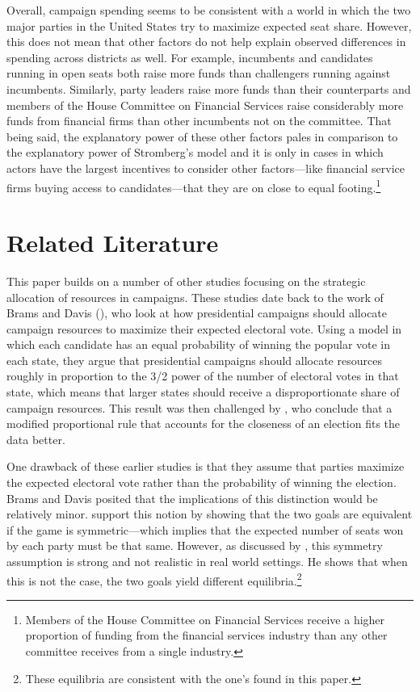 \documentclass[12pt,final,fleqn]{article}
\theoremstyle{plain}
\begin{document}
Overall, campaign spending seems to be consistent with a world in which the two major parties in the United States try to maximize expected seat share. However, this does not mean that other factors do not help explain observed differences in spending across districts as well. For example, incumbents and candidates running in open seats both raise more funds than challengers running against incumbents. Similarly, party leaders raise more funds than their counterparts and members of the House Committee on Financial Services raise considerably more funds from financial firms than other incumbents not on the committee. That being said, the explanatory power of these other factors pales in comparison to the explanatory power of Stromberg's model and it is only in cases in which actors have the largest incentives to consider other factors---like financial service firms buying access to candidates---that they are on close to equal footing.\footnote{Members of the House Committee on Financial Services receive a higher proportion of funding from the financial services industry than any other committee receives from a single industry.}

\section{Related Literature} \label{sec: related literature}
This paper builds on a number of other studies focusing on the strategic allocation of resources in campaigns. These studies date back to the work of Brams and Davis (\citeyear{brams1973resource, brams19743}), who look at how presidential campaigns should allocate campaign resources to maximize their expected electoral vote. Using a model in which each candidate has an equal probability of winning the popular vote in each state, they argue that presidential campaigns should allocate resources roughly in proportion to the 3/2 power of the number of electoral votes in that state, which means that larger states should receive a disproportionate share of campaign resources. This result was then challenged by \citet{colantoni1975campaign}, who conclude that a modified proportional rule that accounts for the closeness of an election fits the data better.

One drawback of these earlier studies is that they assume that parties maximize the expected electoral vote rather than the probability of winning the election. Brams and Davis posited that the implications of this distinction would be relatively minor. \citet{aranson1974election} support this notion by showing that the two goals are equivalent if the game is symmetric---which implies that the expected number of seats won by each party must be that same. However, as discussed by \citet{snyder1989election}, this symmetry assumption is strong and not realistic in real world settings. He shows that when this is not the case, the two goals yield different equilibria.\footnote{These equilibria are consistent with the one's found in this paper.}
\end{document}
